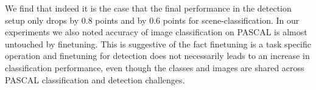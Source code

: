 \documentclass[runningheads]{llncs}
\begin{document}
\setlength{\tabcolsep}{2pt}
\begin{table}[t!]
\begin{center}
\caption{Comparison in performance on of Alex-Net, Finetuned Network(ft-net) and a network with only fc layers finetuned (fc-ft).}
\label{table:fine-effect}
\end{center}
\end{table}
\setlength{\tabcolsep}{1.4pt}

We find that indeed it is the case that the final performance in the detection setup only drops by 0.8 points and by 0.6 points for scene-classification. In our experiments we also noted accuracy of image classification on PASCAL is almost untouched by finetuning. This is suggestive of the fact finetuning is a task specific operation and finetuning for detection does not necessarily leads to an increase in classification performance, even though the classes and images are shared across PASCAL classification and detection challenges. 
\end{document}
